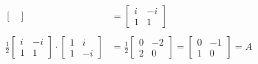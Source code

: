 \documentclass[11pt, a4paper, norsk]{article}
\begin{document}
\begin{Example}{}{}
\begin{align*}
\begin{bmatrix}
                \end{bmatrix} &= \begin{bmatrix}
                i & -i \\
                1 & 1
                \end{bmatrix}
                \\
                \\
               \frac{1}{2} \begin{bmatrix}
                   i & -i \\
                   1 & 1
               \end{bmatrix} \cdot \begin{bmatrix}
                   1 & i \\
                   1 & -i
               \end{bmatrix} &= \frac{1}{2} \begin{bmatrix}
               0 & -2 \\
               2 & 0
               \end{bmatrix} = \begin{bmatrix}
               0 & -1 \\
               1 & 0
               \end{bmatrix} = A
            \end{align*}
        \end{Example}
\end{document}
